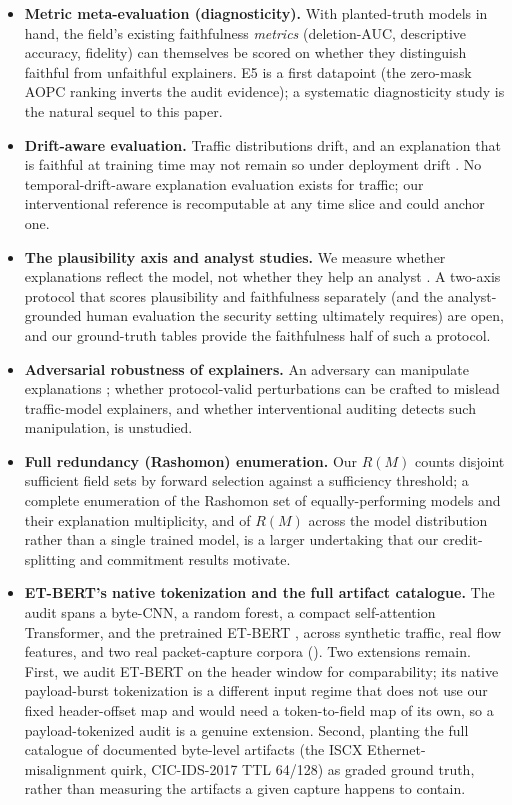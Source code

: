 \documentclass[journal]{IEEEtran}
\begin{document}
\begin{itemize}
\item
  \textbf{Metric meta-evaluation (diagnosticity).} With planted-truth
  models in hand, the field's existing faithfulness \emph{metrics}
  (deletion-AUC, descriptive accuracy, fidelity) can themselves be
  scored on whether they distinguish faithful from unfaithful
  explainers. E5 is a first datapoint (the zero-mask AOPC ranking
  inverts the audit evidence); a systematic diagnosticity study is the
  natural sequel to this paper.
\item
  \textbf{Drift-aware evaluation.} Traffic distributions drift, and an
  explanation that is faithful at training time may not remain so under
  deployment drift \cite{pendlebury2019tesseract}. No
  temporal-drift-aware explanation evaluation exists for traffic; our
  interventional reference is recomputable at any time slice and could
  anchor one.
\item
  \textbf{The plausibility axis and analyst studies.} We measure whether
  explanations reflect the model, not whether they help an analyst
  \cite{jacovi2020towards,alquliti2025evaluating}. A two-axis protocol
  that scores plausibility and faithfulness separately (and the
  analyst-grounded human evaluation the security setting ultimately
  requires) are open, and our ground-truth tables provide the
  faithfulness half of such a protocol.
\item
  \textbf{Adversarial robustness of explainers.} An adversary can
  manipulate explanations \cite{slack2020fooling}; whether
  protocol-valid perturbations can be crafted to mislead traffic-model
  explainers, and whether interventional auditing detects such
  manipulation, is unstudied.
\item
  \textbf{Full redundancy (Rashomon) enumeration.} Our $R(M)$ counts
  disjoint sufficient field sets by forward selection against a
  sufficiency threshold; a complete enumeration of the Rashomon set of
  equally-performing models and their explanation multiplicity, and of
  $R(M)$ across the model distribution rather than a single trained model,
  is a larger undertaking that our credit-splitting and commitment
  results motivate.
\item
  \textbf{ET-BERT's native tokenization and the full artifact
  catalogue.} The audit spans a byte-CNN, a random forest, a compact
  self-attention Transformer, and the pretrained ET-BERT
  \cite{lin2022etbert}, across synthetic traffic, real flow features,
  and two real packet-capture corpora
  (\cite{drapergil2016vpn,wang2017malware}). Two extensions remain.
  First, we audit ET-BERT on the header window for comparability; its
  native payload-burst tokenization is a different input regime that
  does not use our fixed header-offset map and would need a
  token-to-field map of its own, so a payload-tokenized audit is a
  genuine extension. Second, planting the full catalogue of documented
  byte-level artifacts (the ISCX Ethernet-misalignment quirk,
  CIC-IDS-2017 TTL 64/128) as graded ground truth, rather than measuring
  the artifacts a given capture happens to contain.
\end{itemize}
\end{document}
